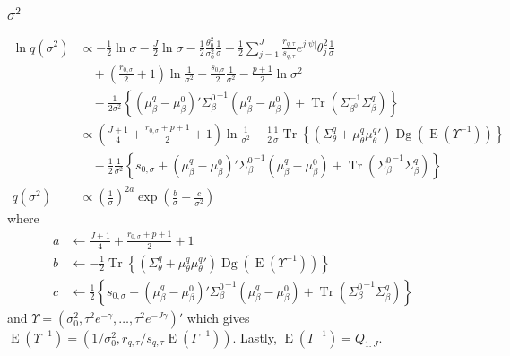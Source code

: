 \documentclass[11pt]{article}
\DeclareMathOperator{\Tr}{Tr}
\newcommand{\opn}{\operatorname}
\begin{document}
\subsubsection{$\sigma^{2}$}
  \begin{align*}
    \ln q\left(\sigma^{2}\right) &\propto -\frac{1}{2}\ln \sigma -\frac{J}{2}\ln \sigma -\frac{1}{2}\frac{\theta_{0}^{2}}{\sigma_{0}^{2}}\frac{1}{\sigma} -\frac{1}{2}\sum_{j=1}^{J}\frac{r_{q,\tau}}{s_{q,\tau}}e^{j\left|\psi\right|}\theta_{j}^{2}\frac{1}{\sigma}\\
    &\quad +\left(\frac{r_{0,\sigma}}{2}+1\right)\ln \frac{1}{\sigma^{2}} -\frac{s_{0,\sigma}}{2}\frac{1}{\sigma^{2}} -\frac{p+1}{2}\ln\sigma^{2}\\
    &\quad -\frac{1}{2\sigma^{2}}\left\{\left(\mu_{\beta}^{q}-\mu_{\beta}^{0}\right)'{\Sigma_{\beta}^{0}}^{-1}\left(\mu_{\beta}^{q}-\mu_{\beta}^{0}\right) + \Tr\left(\Sigma_{{\beta}^{0}}^{-1}\Sigma_{\beta}^{q} \right) \right\}\\
    &\propto \left(\frac{J+1}{4} +\frac{r_{0,\sigma}+p+1}{2} + 1\right)\ln \frac{1}{\sigma^{2}} -\frac{1}{2}\frac{1}{\sigma}\Tr\left\{\left(\Sigma_{\theta}^{q}+\mu_{\theta}^{q}{\mu_{\theta}^{q}}'\right)\opn{Dg}\left(\opn{E}\left(\Upsilon^{-1}\right)\right) \right\}\\
    &\quad -\frac{1}{2}\frac{1}{\sigma^{2}}\left\{s_{0,\sigma} + \left(\mu_{\beta}^{q}-\mu_{\beta}^{0}\right)'{\Sigma_{\beta}^{0}}^{-1}\left(\mu_{\beta}^{q}-\mu_{\beta}^{0}\right)  + \Tr\left({\Sigma_{\beta}^{0}}^{-1}\Sigma_{\beta}^{q}\right) \right\}\\
    q\left(\sigma^{2}\right) &\propto \left(\frac{1}{\sigma}\right)^{2a}\exp\left(\frac{b}{\sigma} -\frac{c}{\sigma^{2}}\right)
  \end{align*}
  where
  \begin{align*}
    a &\leftarrow \frac{J+1}{4} + \frac{r_{0,\sigma}+p+1}{2} + 1\\
    b &\leftarrow -\frac{1}{2}\Tr\left\{\left(\Sigma_{\theta}^{q}+\mu_{\theta}^{q}{\mu_{\theta}^{q}}'\right)\opn{Dg}\left(\opn{E}\left(\Upsilon^{-1}\right)\right) \right\}\\
    c &\leftarrow \frac{1}{2}\left\{s_{0,\sigma} + \left(\mu_{\beta}^{q}-\mu_{\beta}^{0}\right)'{\Sigma_{\beta}^{0}}^{-1}\left(\mu_{\beta}^{q}-\mu_{\beta}^{0}\right)+\Tr\left({\Sigma_{\beta}^{0}}^{-1}\Sigma_{\beta}^{q}\right) \right\}
  \end{align*}
and $\Upsilon = \left(\sigma_{0}^{2}, \tau^{2}e^{-\gamma}, \ldots , \tau^{2}e^{-J\gamma} \right)'$ which gives $\opn{E}\left(\Upsilon^{-1}\right)=\left(1/\sigma_{0}^{2}, r_{q,\tau}/s_{q,\tau}\opn{E}\left(\Gamma^{-1}\right)\right)$. Lastly, $\opn{E}\left(\Gamma^{-1}\right)=Q_{1:J}$.
\end{document}

